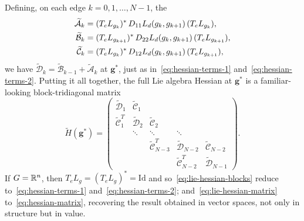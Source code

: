 Defining, on each edge $k = 0, 1, \ldots, N-1$, the 
\begin{equation}
	\begin{aligned}
		\widetilde{\mathcal{A}}_k & = (T_e L_{g_k})^*\, D_{11} L_d(g_k, g_{k+1})\, (T_e L_{g_k}),         \\
		\widetilde{\mathcal{B}}_k & = (T_e L_{g_{k+1}})^*\, D_{22} L_d(g_k, g_{k+1})\, (T_e L_{g_{k+1}}), \\
		\widetilde{\mathcal{C}}_k & = (T_e L_{g_k})^*\, D_{12} L_d(g_k, g_{k+1})\, (T_e L_{g_{k+1}}),
	\end{aligned}
	\label{eq:lie-hessian-blocks}
\end{equation}
we have $\widetilde{\mathcal{D}}_k = \widetilde{\mathcal{B}}_{k-1} + \widetilde{\mathcal{A}}_k$ at $\mathbf{g}^*$, just as in~\eqref{eq:hessian-terms-1} and~\eqref{eq:hessian-terms-2}. Putting it all together, the full Lie algebra Hessian at $\mathbf{g}^*$ is a familiar-looking block-tridiagonal matrix
\begin{equation}
	\widetilde{H}(\mathbf{g}^*) = \begin{pmatrix}
		\widetilde{\mathcal{D}}_1   & \widetilde{\mathcal{C}}_1 &                                 &                                 &                               \\
		\widetilde{\mathcal{C}}_1^T & \widetilde{\mathcal{D}}_2 & \widetilde{\mathcal{C}}_2       &                                 &                               \\
		                            & \ddots                    & \ddots                          & \ddots                          &                               \\
		                            &                           & \widetilde{\mathcal{C}}_{N-3}^T & \widetilde{\mathcal{D}}_{N-2}   & \widetilde{\mathcal{C}}_{N-2} \\
		                            &                           &                                 & \widetilde{\mathcal{C}}_{N-2}^T & \widetilde{\mathcal{D}}_{N-1}
	\end{pmatrix}.
	\label{eq:lie-hessian-matrix}
\end{equation}
If $G = {\mathbb{R}}^n$, then $T_e L_g = (T_e L_g)^* = \mathrm{Id}$ and so~\eqref{eq:lie-hessian-blocks} reduce to~\eqref{eq:hessian-terms-1} and~\eqref{eq:hessian-terms-2}; and~\eqref{eq:lie-hessian-matrix} to~\eqref{eq:hessian-matrix}, recovering the result obtained in vector spaces, not only in structure but in value.


